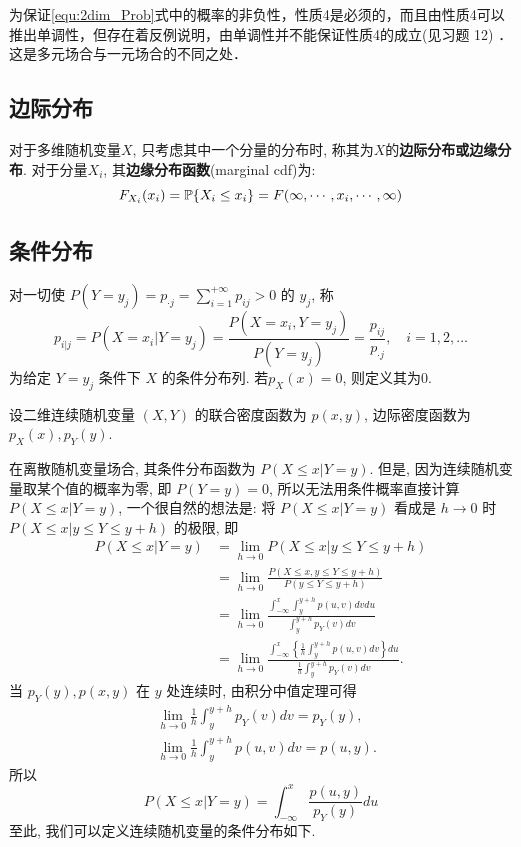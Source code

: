 为保证\ref{equ:2dim_Prob}式中的概率的非负性，性质4是必须的，而且由性质4可以推出单调性，但存在着反例说明，由单调性并不能保证性质4的成立(见习题 12) ．这是多元场合与一元场合的不同之处．

\subsection{边际分布}

\begin{definition}
    对于多维随机变量$X$, 只考虑其中一个分量的分布时, 称其为$X$的\textbf{边际分布或边缘分布}. 对于分量$X_i$, 其\textbf{边缘分布函数}(marginal cdf)为:
    \[ F_{X_i}(x_i) = \P\{ X_i \le x_i \} = F(\infty,\cdots , x_i ,\cdots ,\infty)\]
\end{definition}

\subsection{条件分布}

\begin{definition}\label{def:cond_dist}
    对一切使 $P\left(Y=y_{j}\right)=p_{ \cdot j}=\sum_{i=1}^{+\infty} p_{i j}>0$ 的 $y_j$, 称
    \[ p_{i | j}=P\left(X=x_{i} | Y=y_{j}\right)=\frac{P\left(X=x_{i}, Y=y_{j}\right)}{P\left(Y=y_{j}\right)}
        =\frac{p_{i j}}{p_{\cdot j}}, \quad i=1,2, \ldots \]
    为给定 $Y=y_j$ 条件下 $X$ 的条件分布列. 若$p_X(x)=0$, 则定义其为0.
\end{definition}

设二维连续随机变量 $(X,Y)$ 的联合密度函数为 $p(x,y)$, 边际密度函数为 $p_X(x),p_Y(y)$.

在离散随机变量场合, 其条件分布函数为 $P(X\leq x|Y=y)$. 但是, 因为连续随机变量取某个值的概率为零, 即 $P(Y=y)=0$, 所以无法用条件概率直接计算 $P(X\leq x|Y=y)$, 一个很自然的想法是: 将 $P(X\leq x|Y=y)$ 看成是 $h\to 0$ 时 $P(X\leq x|y\leq Y\leq y+h)$ 的极限, 即
\begin{align*}
    P(X \leq  x | Y=y) & =\lim _{h \to 0} P(X \leq  x | y \leq  Y \leq  y+h)                                                  \\
                       & =\lim _{h \to 0} \frac{P(X \leq  x, y \leq  Y \leq  y+h)}{P(y \leq  Y \leq  y+h)}                    \\
                       & =\lim _{h \to 0} \frac{\int_{-\infty}^{x} \int_{y}^{y+h} p(u, v) dv du}{\int_{y}^{y+h} p_{Y}(v) dv}  \\
                       & =\lim _{h \to 0} \frac{\int_{-\infty}^{x} \left\{ \frac{1}{h} \int_{y}^{y+h} p(u, v) dv \right\} du}
    {\frac{1}{h} \int_{y}^{y+h} p_{Y}(v) dv}.
\end{align*}
当 $p_Y(y),p(x,y)$ 在 $y$ 处连续时, 由积分中值定理可得
\begin{align*}
     & \lim _{h \to 0} \frac{1}{h} \int_{y}^{y+h} p_{Y}(v) dv=p_{Y}(y), \\
     & \lim _{h \to 0} \frac{1}{h} \int_{y}^{y+h} p(u, v) dv=p(u, y).
\end{align*}
所以
\[ P(X \leq x | Y=y)=\int_{-\infty}^{x} \frac{p(u, y)}{p_{Y}(y)} du \]
至此, 我们可以定义连续随机变量的条件分布如下.

